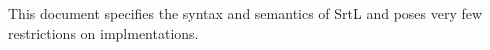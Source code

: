 This document specifies the syntax and semantics of SrtL and poses very few 
restrictions on implmentations.